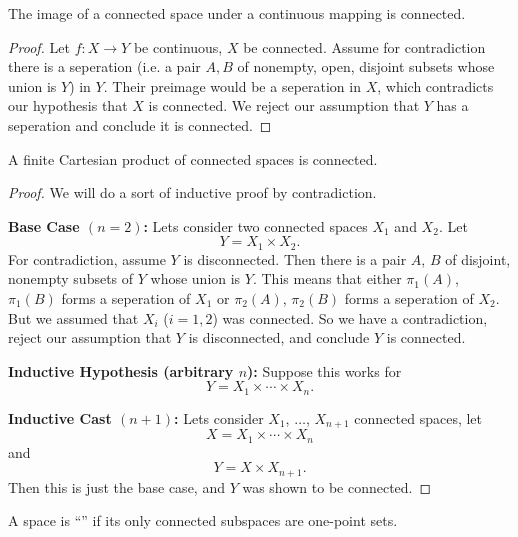 \begin{thm}%
The image of a connected space under a continuous mapping is connected.
\end{thm}
\begin{proof}
Let $f:X\to Y$ be continuous, $X$ be connected. Assume for
contradiction there is a seperation (i.e. a pair $A,B$ of
nonempty, open, disjoint subsets whose union is $Y$) in
$Y$. Their preimage would be a seperation in $X$, which
contradicts our hypothesis that $X$ is connected. We reject our
assumption that $Y$ has a seperation and conclude it is connected.
\end{proof}
\begin{thm}%
A finite Cartesian product of connected spaces is connected.
\end{thm}
\begin{proof}
We will do a sort of inductive proof by contradiction.

\noindent\textbf{Base Case $(n=2)$:} Lets consider two connected
spaces $X_1$ and $X_2$. Let
\begin{equation}%
Y=X_1\times X_2.
\end{equation}
For contradiction, assume $Y$ is disconnected. Then there is a
pair $A$, $B$ of disjoint, nonempty subsets of $Y$ whose union is
$Y$. This means that either $\pi_{1}(A)$, $\pi_{1}(B)$ forms a
seperation of $X_1$ or $\pi_{2}(A)$, $\pi_{2}(B)$ forms a
seperation of $X_2$. But we assumed that $X_i$ ($i=1,2$) was
connected. So we have a contradiction, reject our assumption that
$Y$ is disconnected, and conclude $Y$ is connected.

\noindent\textbf{Inductive Hypothesis (arbitrary $n$):} Suppose
this works for
\begin{equation}%
Y = X_1\times\cdots\times X_n.
\end{equation}

\noindent\textbf{Inductive Cast $(n+1)$:} Lets consider $X_1$,
$\ldots$, $X_{n+1}$ connected spaces, let
\begin{equation}%
X = X_1\times\cdots\times X_n
\end{equation} 
and
\begin{equation}%
Y = X\times X_{n+1}.
\end{equation}
Then this is just the base case, and $Y$ was shown to be connected.
\end{proof}
\begin{defn}%
A space is ``'' if its only
connected subspaces are one-point sets.
\end{defn}
